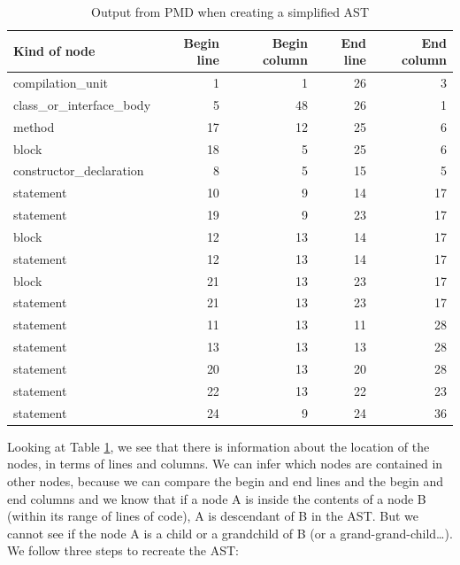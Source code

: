 \documentclass[
]{article}
\begin{document}
\begin{table}[!h]

\caption{\label{tab:unnamed-chunk-2}Output from PMD when creating a simplified AST\label{tab_nodes}}
\centering
\begin{tabular}[t]{l|r|r|r|r}
\hline
Kind of node & Begin line & Begin column & End line & End column\\
\hline
\rowcolor{gray!6}  compilation\_unit & 1 & 1 & 26 & 3\\
\hline
class\_or\_interface\_body & 5 & 48 & 26 & 1\\
\hline
\rowcolor{gray!6}  method & 17 & 12 & 25 & 6\\
\hline
block & 18 & 5 & 25 & 6\\
\hline
\rowcolor{gray!6}  constructor\_declaration & 8 & 5 & 15 & 5\\
\hline
statement & 10 & 9 & 14 & 17\\
\hline
\rowcolor{gray!6}  statement & 19 & 9 & 23 & 17\\
\hline
block & 12 & 13 & 14 & 17\\
\hline
\rowcolor{gray!6}  statement & 12 & 13 & 14 & 17\\
\hline
block & 21 & 13 & 23 & 17\\
\hline
\rowcolor{gray!6}  statement & 21 & 13 & 23 & 17\\
\hline
statement & 11 & 13 & 11 & 28\\
\hline
\rowcolor{gray!6}  statement & 13 & 13 & 13 & 28\\
\hline
statement & 20 & 13 & 20 & 28\\
\hline
\rowcolor{gray!6}  statement & 22 & 13 & 22 & 23\\
\hline
statement & 24 & 9 & 24 & 36\\
\hline
\end{tabular}
\end{table}

\normalsize

Looking at Table \ref{tab_nodes}, we see that there is information about
the location of the nodes, in terms of lines and columns. We can infer
which nodes are contained in other nodes, because we can compare the
begin and end lines and the begin and end columns and we know that if a
node A is inside the contents of a node B (within its range of lines of
code), A is descendant of B in the AST. But we cannot see if the node A
is a child or a grandchild of B (or a grand-grand-child\ldots). We
follow three steps to recreate the AST:
\end{document}
